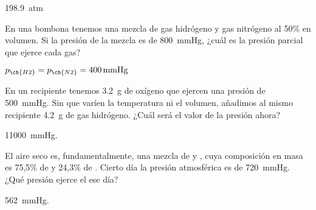 \begin{solution}
  \SI{198.9}{atm}
\end{solution}




\begin{exercise}[
    tags    = {termodinámica, entalpía, entalpia de reacción, calor},
    topics  = {química, termoquímica, termodinámica},
    source  = {FQ 1B SAN 2015, p68, e56},
  ]
  En una bombona tenemos una mezcla de gas hidrógeno y gas nitrógeno al 50\% en volumen. Si la presión de la mezcla es de \SI{800}{\mmHg}, ¿cuál es la presión parcial que ejerce cada gas?
\end{exercise}

\begin{solution}
  \( p_{\ch{H2}} = p_{\ch{N2}} = \SI{400}{\mmHg} \)
\end{solution}



\begin{exercise}[
    tags    = {termodinámica, entalpía, entalpia de reacción, calor},
    topics  = {química, termoquímica, termodinámica},
    source  = {FQ 1B SAN 2015, p68, e57},
  ]
  En un recipiente tenemos \SI{3.2}{\gram} de oxígeno que ejercen una presión de \SI{500}{\mmHg}. Sin que varíen la temperatura ni el volumen, añadimos al mismo recipiente \SI{4.2}{\gram} de gas hidrógeno. ¿Cuál será el valor
  de la presión ahora?
\end{exercise}

\begin{solution}
  \SI{11000}{\mmHg}.
\end{solution}




\begin{exercise}[
    tags    = {termodinámica, entalpía, entalpia de reacción, calor},
    topics  = {química, termoquímica, termodinámica},
    source  = {FQ 1B SAN 2015, p68, ejercicio resuelto 16},
  ]
  El aire seco es, fundamentalmente, una mezcla de  y , cuya composición en masa es 75,5\% de  y 24,3\% de . Cierto día la presión atmosférica es de \SI{720}{\mmHg}. ¿Qué presión ejerce el  ese día?
\end{exercise}

\begin{solution}
  \SI{562}{\mmHg}.
\end{solution}




